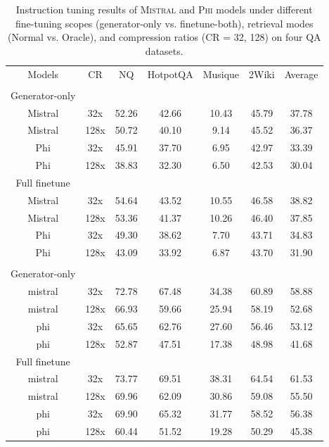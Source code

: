 \documentclass{applemlr}
\numberwithin{equation}{section}
\begin{document}
\begin{table}[H]
\scriptsize
\centering
\begin{tabular}{ccccccc}
\hline
Models & CR & NQ & HotpotQA& Musique& 2Wiki & Average \\
\rowcolor{gray!15}
\multicolumn{7}{c}{\textbf{Normal}} \\
Generator-only \\
\hline 
Mistral&32x&52.26&42.66&10.43&45.79 &37.78\\
Mistral&128x&50.72&40.10&9.14&45.52 & 36.37\\
Phi&32x&45.91&37.70&6.95&42.97 &33.39 \\
Phi&128x&38.83&32.30&6.50&42.53 &30.04 \\
\hline 
Full finetune \\
\hline 
Mistral& 32x & 54.64 & 43.52 & 10.55 & 46.58 & 38.82 \\
Mistral& 128x & 53.36 & 41.37 & 10.26 & 46.40 & 37.85 \\
Phi&  32x & 49.30 & 38.62 & 7.70 & 43.71 & 34.83 \\
Phi&  128x & 43.09 & 33.92 & 6.87 & 43.70 & 31.90 \\
\hline 

\hline
\rowcolor{gray!15}
\multicolumn{7}{c}{\textbf{Oracle}} \\
Generator-only \\
\hline 

mistral&32x&72.78&67.48&34.38&60.89 &58.88\\ 
mistral&128x&66.93&59.66&25.94&58.19 & 52.68\\
phi&32x&65.65&62.76&27.60&56.46 & 53.12\\
phi&128x&52.87&47.51&17.38&48.98 & 41.68\\
\hline 
Full finetune \\
\hline 
mistral & 32x & 73.77 & 69.51 & 38.31 & 64.54 & 61.53 \\
mistral& 128x & 69.96 & 62.09 & 30.86 & 59.08 & 55.50 \\
phi& 32x & 69.90 & 65.32 & 31.77 & 58.52 & 56.38 \\
phi& 128x & 60.44 & 51.52 & 19.28 & 50.29 & 45.38 \\
\hline 
\end{tabular}
\caption{Instruction tuning results of \textsc{Mistral} and \textsc{Phi} models 
under different fine-tuning scopes (generator-only vs. finetune-both), 
retrieval modes (Normal vs. Oracle), and compression ratios (CR = 32, 128) 
on four QA datasets.}
\label{generator-only-instruction-tuning}
\end{table}
\end{document}
